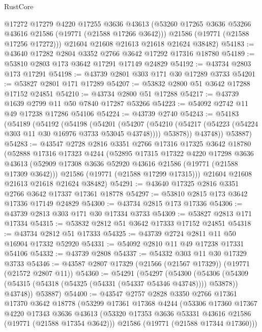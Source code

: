 \begin{lexlean}{RustCore}
\begin{coremodule}
        @17272
        @17279
        @4220
        @17255
        @3636
        @43613
        (@53260 @17265 @3636 @53266 @43616 @21586 (@19771 (@21588 @17266 @3642)))
        @21586
        (@19771 (@21588 @17256 @17272)))
      @21604
      @21608
      @21613
      @21618
      @21624
      @38482)
@54183 := @43640 @17282 @2804 @3352 @2766 @3642 @17292 @17316 @18780
@54189 := @53810 @2803 @173 @3642 @17291 @17149 @24829
@54192 := @43734 @2803 @173 @17291
@54198 := @43739 @2801 @303 @171 @30 @17289 @3733
@54201 := @53827 @2801 @171 @17289
@54207 := @53832 @2800 @51 @3642 @17288 @17152 @24851
@54210 := @43734 @2800 @51 @17288
@54217 := @43739 @1639 @2799 @11 @50 @7840 @17287 @53266
@54223 := @54092 @2742 @11 @49 @17238 @17286 @54106
@54224 := @43739 @2740
@54243 := @54183
    (@54189
      (@54192
        (@54198
          (@54201
            (@54207
              (@54210 (@54217 (@54223 (@54224 @303 @11 @30 @16976 @3733 @53045 @43748))))
              @53878))
          @43748))
      @53887)
@54283 := @43547
    @2728
    @2816
    @3351
    @2766
    @17316
    @17325
    @3642
    @18780
    (@52888
      @17316
      @17323
      @4244
      (@52895
        @17315
        @17322
        @4220
        @17298
        @3636
        @43613
        (@52909 @17308 @3636 @52920 @43616 @21586 (@19771 (@21588 @17309 @3642)))
        @21586
        (@19771 (@21588 @17299 @17315)))
      @21604
      @21608
      @21613
      @21618
      @21624
      @38482)
@54291 := @43640 @17325 @2816 @3351 @2766 @3642 @17337 @17361 @18778
@54297 := @53810 @2815 @173 @3642 @17336 @17149 @24829
@54300 := @43734 @2815 @173 @17336
@54306 := @43739 @2813 @303 @171 @30 @17334 @3733
@54309 := @53827 @2813 @171 @17334
@54315 := @53832 @2812 @51 @3642 @17333 @17152 @24851
@54318 := @43734 @2812 @51 @17333
@54325 := @43739 @2724 @2811 @11 @50 @16904 @17332 @52920
@54331 := @54092 @2810 @11 @49 @17238 @17331 @54106
@54332 := @43739 @2808
@54337 := @54332 @303 @11 @30 @17329 @3733
@54346 := @43587 @2807 @17329 (@21566 (@21567 @17329)) (@19771 (@21572 @2807 @11))
@54360 := @54291
    (@54297
      (@54300
        (@54306 (@54309 (@54315 (@54318 (@54325 (@54331 (@54337 @54346 @43748)))) @53878)) @43748))
      @53887)
@54400 := @43547
    @2757
    @2828
    @3350
    @2766
    @17361
    @17370
    @3642
    @18778
    (@53299
      @17361
      @17368
      @4244
      (@53306
        @17360
        @17367
        @4220
        @17343
        @3636
        @43613
        (@53320 @17353 @3636 @53331 @43616 @21586 (@19771 (@21588 @17354 @3642)))
        @21586
        (@19771 (@21588 @17344 @17360)))

\end{coremodule}
\end{lexlean}
